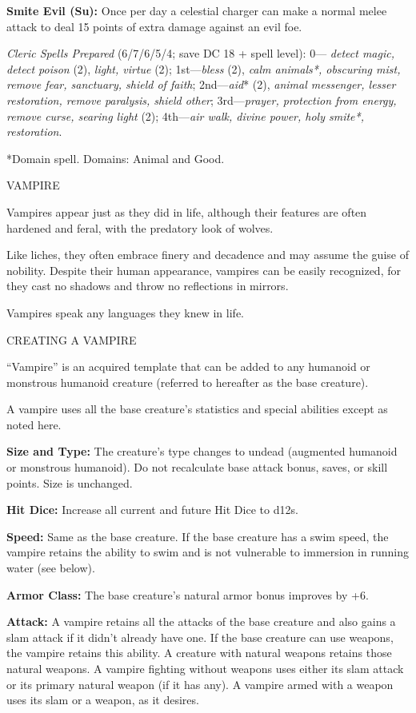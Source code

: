 \documentclass{article}
\begin{document}
\textbf{Smite Evil (Su): }Once per day a celestial charger can make a normal melee 
attack to deal 15 points of extra damage against an evil foe.

\textit{Cleric Spells Prepared }(6/7/6/5/4; save DC 18 + spell level): 0--- \textit{detect 
magic, detect poison }(2), \textit{light, virtue }(2); 1st---\textit{bless }(2), 
\textit{calm animals*, obscuring mist, remove fear, sanctuary, shield of faith}; 
2nd---\textit{aid}* (2), \textit{animal messenger, lesser restoration, remove paralysis, 
shield other}; 3rd---\textit{prayer, protection from energy, remove curse, searing 
light }(2); 4th---\textit{air walk, divine power, holy smite*, restoration}.

*Domain spell. Domains: Animal and Good.

\vspace{12pt}
{\LARGE{}VAMPIRE}

Vampires appear just as they did in life, although their features are often hardened 
and feral, with the predatory look of wolves.

Like liches, they often embrace finery and decadence and may assume the guise of 
nobility. Despite their human appearance, vampires can be easily recognized, for 
they cast no shadows and throw no reflections in mirrors.

Vampires speak any languages they knew in life.

CREATING A VAMPIRE

``Vampire'' is an acquired template that can be added to any humanoid or monstrous 
humanoid creature (referred to hereafter as the base creature).

A vampire uses all the base creature's statistics and special abilities except 
as noted here.

\textbf{Size and Type: }The creature's type changes to undead (augmented humanoid 
or monstrous humanoid). Do not recalculate base attack bonus, saves, or skill points. 
Size is unchanged.

\textbf{Hit Dice:} Increase all current and future Hit Dice to d12s.

\textbf{Speed: }Same as the base creature. If the base creature has a swim speed, 
the vampire retains the ability to swim and is not vulnerable to immersion in running 
water (see below).

\textbf{Armor Class: }The base creature's natural armor bonus improves by +6.

\textbf{Attack:} A vampire retains all the attacks of the base creature and also 
gains a slam attack if it didn't already have one. If the base creature can use 
weapons, the vampire retains this ability. A creature with natural weapons retains 
those natural weapons. A vampire fighting without weapons uses either its slam 
attack or its primary natural weapon (if it has any). A vampire armed with a weapon 
uses its slam or a weapon, as it desires.
\end{document}
